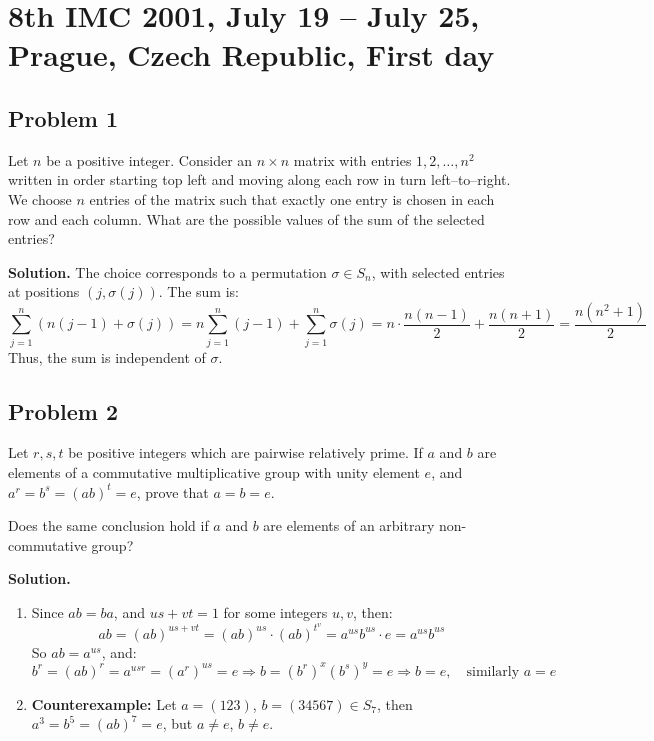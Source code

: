 \documentclass{article}
\begin{document}
\pagestyle{plain}

\section*{8th IMC 2001, July 19 -- July 25, Prague, Czech Republic, First day}

\subsection*{Problem 1}

Let \( n \) be a positive integer. Consider an \( n \times n \) matrix with entries \( 1, 2, \ldots, n^2 \) written in order starting top left and moving along each row in turn left–to–right. We choose \( n \) entries of the matrix such that exactly one entry is chosen in each row and each column. What are the possible values of the sum of the selected entries?

\textbf{Solution.} The choice corresponds to a permutation \( \sigma \in S_n \), with selected entries at positions \( (j, \sigma(j)) \). The sum is:
\[
\sum_{j=1}^{n} \left( n(j - 1) + \sigma(j) \right)
= n \sum_{j=1}^{n} (j - 1) + \sum_{j=1}^{n} \sigma(j)
= n \cdot \frac{n(n - 1)}{2} + \frac{n(n + 1)}{2} = \frac{n(n^2 + 1)}{2}
\]
Thus, the sum is independent of \( \sigma \).

\subsection*{Problem 2}

Let \( r, s, t \) be positive integers which are pairwise relatively prime. If \( a \) and \( b \) are elements of a commutative multiplicative group with unity element \( e \), and \( a^r = b^s = (ab)^t = e \), prove that \( a = b = e \).

Does the same conclusion hold if \( a \) and \( b \) are elements of an arbitrary non-commutative group?

\textbf{Solution.}
\begin{enumerate}
\item Since \( ab = ba \), and \( us + vt = 1 \) for some integers \( u, v \), then:
\[
ab = (ab)^{us + vt} = (ab)^{us} \cdot (ab)^t^v = a^{us} b^{us} \cdot e = a^{us} b^{us}
\]
So \( ab = a^{us} \), and:
\[
b^r = (ab)^r = a^{usr} = (a^r)^{us} = e
\Rightarrow b = (b^r)^x (b^s)^y = e
\Rightarrow b = e, \quad \text{similarly } a = e
\]
\item \textbf{Counterexample:} Let \( a = (123) \), \( b = (34567) \in S_7 \), then \( a^3 = b^5 = (ab)^7 = e \), but \( a \ne e \), \( b \ne e \).
\end{enumerate}
\end{document}
